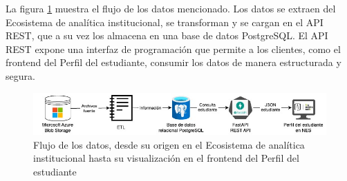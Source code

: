 La figura \ref{fig:flujo_datos} muestra el flujo de los datos mencionado. Los datos se extraen del Ecosistema de analítica institucional, se transforman y se cargan en el API REST, que a su vez los almacena en una base de datos PostgreSQL. El API REST expone una interfaz de programación que permite a los clientes, como el frontend del Perfil del estudiante, consumir los datos de manera estructurada y segura.

\begin{figure}[h]
	\centering
	\includegraphics[width=\textwidth]{img/flujo-datos.jpg}
	\caption{Flujo de los datos, desde su origen en el Ecosistema de analítica institucional hasta su visualización en el frontend del Perfil del estudiante}
	\label{fig:flujo_datos}
\end{figure}
